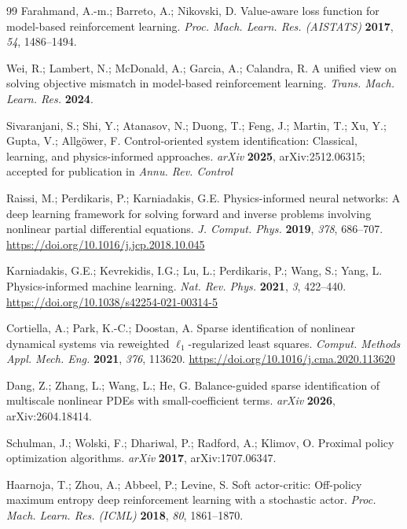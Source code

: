 \begin{thebibliography}{99}
Farahmand, A.-m.; Barreto, A.; Nikovski, D. Value-aware loss function for model-based
reinforcement learning. \textit{Proc. Mach. Learn. Res. (AISTATS)} \textbf{2017},
\textit{54}, 1486--1494.

Wei, R.; Lambert, N.; McDonald, A.; Garcia, A.; Calandra, R. A unified view on solving
objective mismatch in model-based reinforcement learning. \textit{Trans. Mach. Learn. Res.}
\textbf{2024}.

Sivaranjani, S.; Shi, Y.; Atanasov, N.; Duong, T.; Feng, J.; Martin, T.; Xu, Y.; Gupta, V.;
Allg\"ower, F. Control-oriented system identification: Classical, learning, and
physics-informed approaches. \textit{arXiv} \textbf{2025}, arXiv:2512.06315; accepted for
publication in \textit{Annu. Rev. Control}

Raissi, M.; Perdikaris, P.; Karniadakis, G.E. Physics-informed neural networks: A deep
learning framework for solving forward and inverse problems involving nonlinear partial
differential equations. \textit{J. Comput. Phys.} \textbf{2019}, \textit{378}, 686--707.
\url{https://doi.org/10.1016/j.jcp.2018.10.045}

Karniadakis, G.E.; Kevrekidis, I.G.; Lu, L.; Perdikaris, P.; Wang, S.; Yang, L.
Physics-informed machine learning. \textit{Nat. Rev. Phys.} \textbf{2021}, \textit{3},
422--440. \url{https://doi.org/10.1038/s42254-021-00314-5}

Cortiella, A.; Park, K.-C.; Doostan, A. Sparse identification of nonlinear dynamical systems
via reweighted $\ell_1$-regularized least squares. \textit{Comput. Methods Appl. Mech. Eng.}
\textbf{2021}, \textit{376}, 113620. \url{https://doi.org/10.1016/j.cma.2020.113620}

Dang, Z.; Zhang, L.; Wang, L.; He, G. Balance-guided sparse identification of multiscale
nonlinear PDEs with small-coefficient terms. \textit{arXiv} \textbf{2026}, arXiv:2604.18414.

Schulman, J.; Wolski, F.; Dhariwal, P.; Radford, A.; Klimov, O. Proximal policy optimization
algorithms. \textit{arXiv} \textbf{2017}, arXiv:1707.06347.

Haarnoja, T.; Zhou, A.; Abbeel, P.; Levine, S. Soft actor-critic: Off-policy maximum entropy
deep reinforcement learning with a stochastic actor. \textit{Proc. Mach. Learn. Res. (ICML)}
\textbf{2018}, \textit{80}, 1861--1870.


\end{thebibliography}
